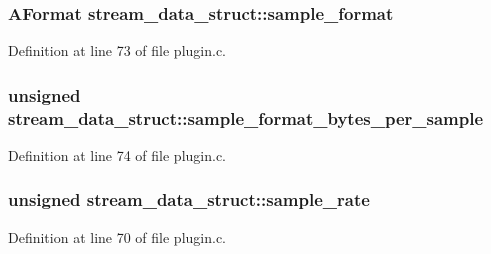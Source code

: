 \subsubsection[{\texorpdfstring{sample\+\_\+format}{sample_format}}]{\setlength{\rightskip}{0pt plus 5cm}A\+Format stream\+\_\+data\+\_\+struct\+::sample\+\_\+format}\hypertarget{structstream__data__struct_a5504cfea12e06c513d7827cc3fed3e62}{}\label{structstream__data__struct_a5504cfea12e06c513d7827cc3fed3e62}


Definition at line 73 of file plugin.\+c.

\subsubsection[{\texorpdfstring{sample\+\_\+format\+\_\+bytes\+\_\+per\+\_\+sample}{sample_format_bytes_per_sample}}]{\setlength{\rightskip}{0pt plus 5cm}unsigned stream\+\_\+data\+\_\+struct\+::sample\+\_\+format\+\_\+bytes\+\_\+per\+\_\+sample}\hypertarget{structstream__data__struct_a242bcc66f0b52da3c8269f89a26e1189}{}\label{structstream__data__struct_a242bcc66f0b52da3c8269f89a26e1189}


Definition at line 74 of file plugin.\+c.

\subsubsection[{\texorpdfstring{sample\+\_\+rate}{sample_rate}}]{\setlength{\rightskip}{0pt plus 5cm}unsigned stream\+\_\+data\+\_\+struct\+::sample\+\_\+rate}\hypertarget{structstream__data__struct_a9dd82b2fb78b3514f8356c8c4b71914d}{}\label{structstream__data__struct_a9dd82b2fb78b3514f8356c8c4b71914d}


Definition at line 70 of file plugin.\+c.

